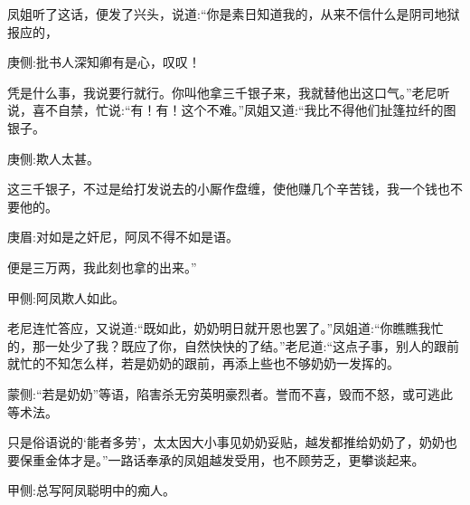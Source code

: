 \begin{parag}
    凤姐听了这话，便发了兴头，说道:“你是素日知道我的，从来不信什么是阴司地狱报应的，\begin{note}庚侧:批书人深知卿有是心，叹叹！\end{note}凭是什么事，我说要行就行。你叫他拿三千银子来，我就替他出这口气。”老尼听说，喜不自禁，忙说:“有！有！这个不难。”凤姐又道:“我比不得他们扯篷拉纤的图银子。\begin{note}庚侧:欺人太甚。\end{note}这三千银子，不过是给打发说去的小厮作盘缠，使他赚几个辛苦钱，我一个钱也不要他的。\begin{note}庚眉:对如是之奸尼，阿凤不得不如是语。\end{note}便是三万两，我此刻也拿的出来。”\begin{note}甲侧:阿凤欺人如此。\end{note}老尼连忙答应，又说道:“既如此，奶奶明日就开恩也罢了。”凤姐道:“你瞧瞧我忙的，那一处少了我？既应了你，自然快快的了结。”老尼道:“这点子事，别人的跟前就忙的不知怎么样，若是奶奶的跟前，再添上些也不够奶奶一发挥的。\begin{note}蒙侧:“若是奶奶”等语，陷害杀无穷英明豪烈者。誉而不喜，毁而不怒，或可逃此等术法。\end{note}只是俗语说的‘能者多劳’，太太因大小事见奶奶妥贴，越发都推给奶奶了，奶奶也要保重金体才是。”一路话奉承的凤姐越发受用，也不顾劳乏，更攀谈起来。\begin{note}甲侧:总写阿凤聪明中的痴人。\end{note}
\end{parag}



